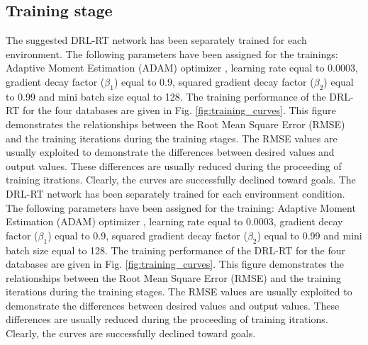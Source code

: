 \documentclass{svproc}
\begin{document}
	\subsection{Training stage} 
	The suggested DRL-RT network has been separately trained for each environment. The following parameters have been assigned for the trainings: Adaptive Moment Estimation (ADAM) optimizer \cite{kingma2014adam}, learning rate equal to 0.0003, gradient decay factor ($\beta_1$) equal to 0.9, squared gradient decay factor ($\beta_2$) equal to 0.99 and mini batch size equal to 128. The training performance of the DRL-RT for the four databases are given in Fig. \ref{fig:training_curves}. This figure demonstrates the relationships between the Root Mean Square Error (RMSE) and the training iterations during the training stages. The RMSE values are usually exploited to demonstrate the differences between desired values and output values.	These differences are usually reduced during the proceeding of training itrations. Clearly, the curves are successfully declined toward goals.
	The  DRL-RT network has been separately trained for each environment condition. The following parameters have been assigned for the training: Adaptive Moment Estimation (ADAM) optimizer \cite{kingma2014adam}, learning rate equal to 0.0003, gradient decay factor ($\beta_1$) equal to 0.9, squared gradient decay factor ($\beta_2$) equal to 0.99 and mini batch size equal to 128. The training performance of the DRL-RT for the four databases are given in Fig. \ref{fig:training_curves}. This figure demonstrates the relationships between the Root Mean Square Error (RMSE) and the training iterations during the training stages. The RMSE values are usually exploited to demonstrate the differences between desired values and output values.	These differences are usually reduced during the proceeding of training itrations. Clearly, the curves are successfully declined toward goals.
	
\end{document}
